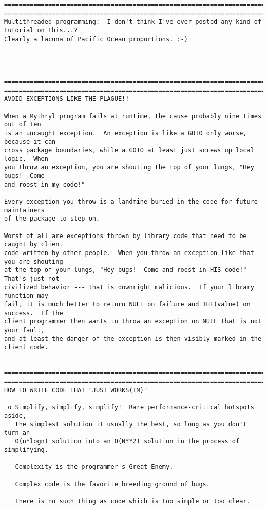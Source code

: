 \begin{verbatim}
====================================================================================
====================================================================================
Multithreaded programming:  I don't think I've ever posted any kind of tutorial on this...?
Clearly a lacuna of Pacific Ocean proportions. :-)




====================================================================================
====================================================================================
AVOID EXCEPTIONS LIKE THE PLAGUE!!

When a Mythryl program fails at runtime, the cause probably nine times out of ten
is an uncaught exception.  An exception is like a GOTO only worse, because it can
cross package boundaries, while a GOTO at least just screws up local logic.  When
you throw an exception, you are shouting the top of your lungs, "Hey bugs!  Come
and roost in my code!"

Every exception you throw is a landmine buried in the code for future maintainers
of the package to step on.

Worst of all are exceptions thrown by library code that need to be caught by client
code written by other people.  When you throw an exception like that you are shouting
at the top of your lungs, "Hey bugs!  Come and roost in HIS code!"  That's just not
civilized behavior --- that is downright malicious.  If your library function may
fail, it is much better to return NULL on failure and THE(value) on success.  If the
client programmer then wants to throw an exception on NULL that is not your fault,
and at least the danger of the exception is then visibly marked in the client code.


====================================================================================
====================================================================================
HOW TO WRITE CODE THAT "JUST WORKS(TM)"

 o Simplify, simplify, simplify!  Rare performance-critical hotspots aside,
   the simplest solution it usually the best, so long as you don't turn an
   O(n*logn) solution into an O(N**2) solution in the process of simplifying.

   Complexity is the programmer's Great Enemy.

   Complex code is the favorite breeding ground of bugs.

   There is no such thing as code which is too simple or too clear.


\end{verbatim}
